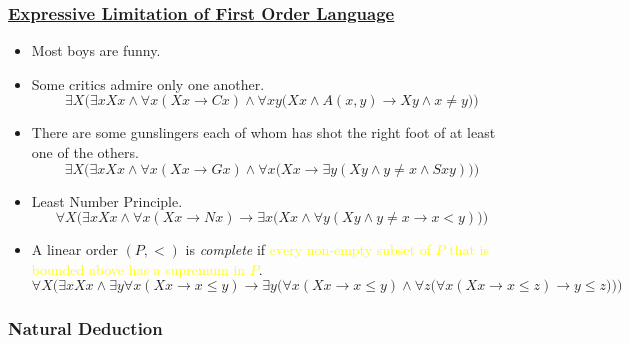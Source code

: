 \documentclass[UTF8,11pt,colorlinks,compress,openany]{beamer}%
\begin{document}
\begin{frame}\frametitle{\href{https://www.pdcnet.org/jphil/content/jphil_1984_0081_0008_0430_0449}{Expressive Limitation of First Order Language}}
\begin{itemize}
	\item Most boys are funny.
	\item Some critics admire only one another.
\[\exists X\Big(\exists x Xx\wedge \forall x(Xx\to Cx)\wedge \forall xy\big(Xx\wedge A(x,y)\to Xy\wedge x\ne y\big)\Big)\]
	\item There are some gunslingers each of whom has shot the right foot of at least one of the others.
\[\exists X\Big(\exists xXx\wedge \forall x(Xx\to Gx)\wedge\forall x\big(Xx\to\exists y(Xy\wedge y\ne x\wedge Sxy)\big)\Big)\]
	\item Least Number Principle.
\[\forall X\Big(\exists xXx\wedge \forall x(Xx\to Nx)\to\exists x\big(Xx\wedge\forall y(Xy\wedge y\ne x\to x<y)\big)\Big)\]
	\item A linear order $(P,<)$ is \emph{complete} if \textcolor{yellow}{every non-empty subset of $P$ that is bounded above has a supremum in $P$}.\\
$\forall X\bigg(\exists x Xx\wedge\exists y\forall x(Xx\to x\leq y)\to\exists y\Big(\forall x(Xx\to x\leq y)\wedge\forall z\big(\forall x(Xx\to x\leq z)\to y\leq z\big)\Big)\bigg)$
\end{itemize}
\end{frame}

\subsubsection{Natural Deduction}
\end{document}
